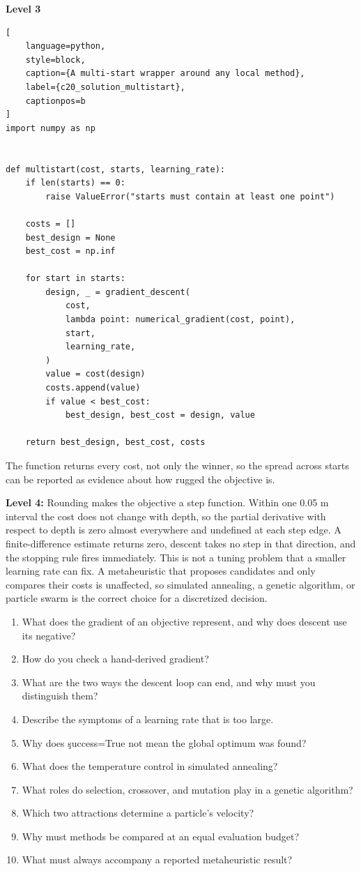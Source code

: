 \textbf{Level 3}

\begin{lstlisting}[
    language=python,
    style=block,
    caption={A multi-start wrapper around any local method},
    label={c20_solution_multistart},
    captionpos=b
]
import numpy as np


def multistart(cost, starts, learning_rate):
    if len(starts) == 0:
        raise ValueError("starts must contain at least one point")

    costs = []
    best_design = None
    best_cost = np.inf

    for start in starts:
        design, _ = gradient_descent(
            cost,
            lambda point: numerical_gradient(cost, point),
            start,
            learning_rate,
        )
        value = cost(design)
        costs.append(value)
        if value < best_cost:
            best_design, best_cost = design, value

    return best_design, best_cost, costs
\end{lstlisting}

The function returns every cost, not only the winner, so the spread across
starts can be reported as evidence about how rugged the objective is.

\textbf{Level 4:} Rounding makes the objective a step function. Within one
0.05 m interval the cost does not change with depth, so the partial derivative
with respect to depth is zero almost everywhere and undefined at each step edge.
A finite-difference estimate returns zero, descent takes no step in that
direction, and the stopping rule fires immediately. This is not a tuning problem
that a smaller learning rate can fix. A metaheuristic that proposes candidates
and only compares their costs is unaffected, so simulated annealing, a genetic
algorithm, or particle swarm is the correct choice for a discretized decision.


\begin{enumerate}
    \item What does the gradient of an objective represent, and why does descent
          use its negative?
    \item How do you check a hand-derived gradient?
    \item What are the two ways the descent loop can end, and why must you
          distinguish them?
    \item Describe the symptoms of a learning rate that is too large.
    \item Why does \c{success=True} not mean the global optimum was found?
    \item What does the temperature control in simulated annealing?
    \item What roles do selection, crossover, and mutation play in a genetic
          algorithm?
    \item Which two attractions determine a particle's velocity?
    \item Why must methods be compared at an equal evaluation budget?
    \item What must always accompany a reported metaheuristic result?
\end{enumerate}

